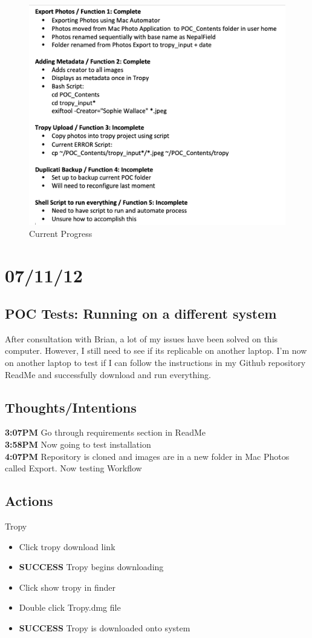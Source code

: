 \documentclass{article}
\begin{document}
\begin{figure}[H]
    \centering
    \includegraphics[width=\textwidth]{Images/Progress.png}
    \caption{Current Progress}
    \label{fig:my_label}
\end{figure}

\section{07/11/12}
\subsection{POC Tests: Running on a different system}
After consultation with Brian, a lot of my issues have been solved on this computer. However, I still need to see if its replicable on another laptop. I'm now on another laptop to test if I can follow the instructions in my Github repository ReadMe and successfully download and run everything.
\subsection{Thoughts/Intentions}
\textbf{3:07PM} Go through requirements section in ReadMe \\
\textbf{3:58PM} Now going to test installation \\
\textbf{4:07PM} Repository is cloned and images are in a new folder in Mac Photos called Export. Now testing Workflow

\subsection{Actions}
Tropy
\begin{itemize}
\item Click tropy download link
\item \textbf{SUCCESS} Tropy begins downloading
\item Click show tropy in finder
\item Double click Tropy.dmg file
\item \textbf{SUCCESS} Tropy is downloaded onto system
\end{itemize}
\end{document}
